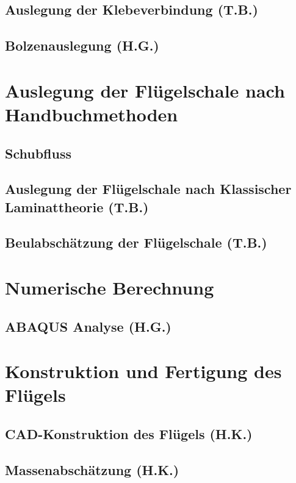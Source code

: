 \documentclass[a4paper,oneside,11pt]{article}
\begin{document}
\subsection{Auslegung der Klebeverbindung (T.B.)}

\newpage
\subsection{Bolzenauslegung (H.G.)}

\newpage
\section{Auslegung der Flügelschale nach Handbuchmethoden}
\subsection{Schubfluss}

\newpage
\subsection{Auslegung der Flügelschale nach Klassischer Laminattheorie (T.B.)}

\newpage
\subsection{Beulabschätzung der Flügelschale (T.B.)}

\newpage
\section{Numerische Berechnung}\label{FEM}

\newpage
\subsection{ABAQUS Analyse (H.G.)}

\newpage
\section{Konstruktion und Fertigung des Flügels}
\subsection{CAD-Konstruktion des Flügels (H.K.)}\label{CAD}

\newpage
\subsection{Massenabschätzung (H.K.)}

\newpage
\end{document}
